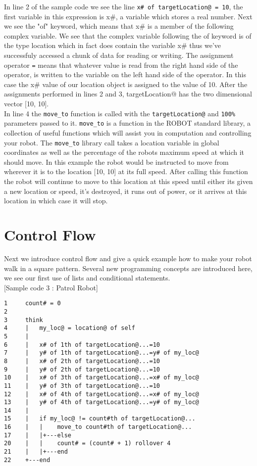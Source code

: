 \documentclass[a4paper]{article}
\begin{document}
In line 2 of the sample code we see the line \texttt{x\# of targetLocation@ = 10}, the first variable in this expression is x\#, a variable which stores a real number. Next we see the "of" keyword, which means that x\# is a member of the following complex variable. We see that the complex variable following the of keyword is of the type location which in fact does contain the variable x\# thus we've successfuly accessed a chunk of data for reading or writing. The assignment operator \texttt{=} means that whatever value is read from the right hand side of the operator, is written to the variable on the left hand side of the operator. In this case the x\# value of our location object is assigned to the value of 10. After the assignments performed in lines 2 and 3, targetLocation@ has the two dimensional vector [10, 10].\\

In line 4 the \texttt{move\_to} function is called with the \texttt{targetLocation@}  and \texttt{100\%} parameters passed to it. \texttt{move\_to} is a function in the ROBOT standard library, a collection of useful functions which will assist you in computation and controlling your robot. The \texttt{move\_to} library call takes a location variable in global coordinates as well as the percentage of the robots maximum speed at which it should move. In this example the robot would be instructed to move from wherever it is to the location [10, 10] at its full speed. After calling this function the robot will continue to move to this location at this speed until either its given a new location or speed, it's destroyed, it runs out of power, or it arrives at this location in which case it will stop.\\

\pagebreak

\section{Control Flow}
 
Next we introduce control flow and give a quick example how to make your robot walk in a square pattern. Several new programming concepts are introduced here, we see our first use of lists and conditional statements.\\

[Sample code 3 : Patrol Robot]
\begin{verbatim}
1     count# = 0
2
3     think
4     |   my_loc@ = location@ of self
5     |  
6     |   x# of 1th of targetLocation@...=10
7     |   y# of 1th of targetLocation@...=y# of my_loc@
8     |   x# of 2th of targetLocation@...=10
9     |   y# of 2th of targetLocation@...=10
10    |   x# of 3th of targetLocation@...=x# of my_loc@
11    |   y# of 3th of targetLocation@...=10
12    |   x# of 4th of targetLocation@...=x# of my_loc@
13    |   y# of 4th of targetLocation@...=y# of my_loc@
14    |   
15    |   if my_loc@ != count#th of targetLocation@...
16    |   |    move_to count#th of targetLocation@...
17    |   |+---else
20    |   |    count# = (count# + 1) rollover 4
21    |   |+---end
22    +---end
\end{verbatim}
\end{document}
